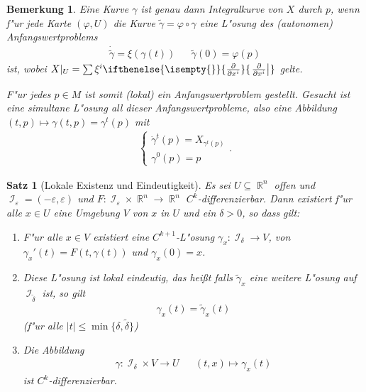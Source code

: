 \documentclass[paper=A4, twoside, chapterprefix=true, bibliography=totoc, headsepline]{scrbook}
\let\temp\phi{}
\let\phi\varphi{}
\let\varphi\temp{}
\let\temp\theta{}
\let\theta\vartheta{}
\let\vartheta\temp{}
\let\temp\epsilon{}
\let\epsilon\varepsilon{}
\let\varepsilon\temp{}
\let\temp\rho{}
\let\rho\varrho{}
\let\varrho\temp{}
\DeclareMathOperator{\R}{\mathbb{R}}
\DeclareMathOperator{\calI}{\mathcal{I}}
\newcommand{\pdifffrac}[3][]{\ifthenelse{\isempty{#1}}{\frac{\partial #2}{\partial #3}}{\left. \frac{\partial #2}{\partial #3} \right|_{#1}}}
\theoremstyle{plain}
\newtheorem{Satz}[Dfn]{Satz}
\theoremstyle{nonumberplain}
\newtheorem{bem}{Bemerkung}
\theoremstyle{empty}
\theoremstyle{break}
\newcommand{\quot}[1]{\textrm{\glqq}{#1}\textrm{\grqq}}
\begin{document}
\begin{bem}
  Eine Kurve $\gamma$ ist genau dann Integralkurve von $X$ durch $p$, wenn f"ur jede Karte $(\phi,U)$ die Kurve $\tilde \gamma = \phi \circ \gamma$ eine L"osung des (autonomen) Anfangswertproblems
  \begin{align*}
    \dot{\tilde \gamma} = \xi(\gamma(t)) && \tilde \gamma(0) = \phi(p)
  \end{align*}
  ist, wobei $X|_U = \sum \xi^i \pdifffrac{}{x^i}$ gelte.

  F"ur jedes $p \in M$ ist somit (lokal) ein Anfangswertproblem gestellt.
  Gesucht ist eine \quot{simultane} L"osung all dieser Anfangswertprobleme, also eine Abbildung $(t,p) \mapsto \gamma(t,p) = \gamma^t(p)$ mit 
  \begin{align*}
    \begin{cases}
      \dot \gamma^t(p) = X_{\gamma^t(p)}\\
      \gamma^0(p) = p
    \end{cases}.
  \end{align*}
\end{bem}

\begin{Satz}[Lokale Existenz und Eindeutigkeit]\label{satz-4-6}
  Es sei $U \subseteq \R^n$ offen und $\calI_{\epsilon}=(-\epsilon,\epsilon)$ und $F \colon \calI_{\epsilon} \times \R^n \to \R^n$ $C^k$-differenzierbar.
  Dann existiert f"ur alle $x \in U$ eine Umgebung $V$ von $x$ in $U$ und ein $\delta > 0$, so dass gilt:
  \begin{enumerate}[label=(\roman*),leftmargin=*,widest=iii]
  \item F"ur alle $x \in V$ existiert eine $C^{k+1}$-L"osung $\gamma_x\colon \calI_{\delta} \to V$, von $\gamma_x'(t)=F(t,\gamma(t))$ und $\gamma_x(0) = x$.
  \item\label{satz-4-6-ii} Diese L"osung ist lokal eindeutig, das hei\ss t falls $\tilde \gamma_x$ eine weitere L"osung auf $\calI_{\tilde\delta}$ ist, so gilt
    \begin{align*}
      \gamma_x(t) = \tilde \gamma_x(t)
    \end{align*}
    (f"ur alle $|t| \leq \min\{\delta, \tilde\delta\}$)
  \item Die Abbildung 
    \begin{align*}
      \gamma\colon \calI_{\delta} \times V \to U && (t,x) \mapsto \gamma_x(t)
    \end{align*}
    ist $C^k$-differenzierbar.
  \end{enumerate}
\end{Satz}
\end{document}
